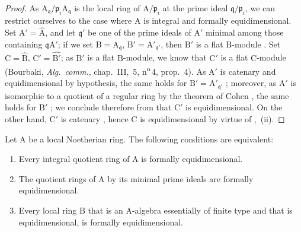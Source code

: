 \begin{proof}
As $\mathrm{A}_\mathfrak{q}/\mathfrak{p}_i\mathrm{A}_\mathfrak{q}$ is the local ring of $\mathrm{A}/\mathfrak{p}_i$ at the prime ideal $\mathfrak{q}/\mathfrak{p}_i$, we can restrict ourselves to the case where $\mathrm{A}$ is integral and formally equidimensional.
Set $\mathrm{A}'=\widehat{\mathrm{A}}$, and let $\mathfrak{q}'$ be one of the prime ideals of $\mathrm{A}'$ minimal among those containing $\mathfrak{q}\mathrm{A}'$; if we set $\mathrm{B}=\mathrm{A}_\mathfrak{q}$, $\mathrm{B}'=\mathrm{A}'_{\mathfrak{q}'}$, then $\mathrm{B}'$ is a flat $\mathrm{B}$-module .
Set $\mathrm{C}=\widehat{\mathrm{B}}$, $\mathrm{C}'=\widehat{\mathrm{B}'}$; as $\mathrm{B}'$ is a flat $\mathrm{B}$-module, we know that $\mathrm{C}'$ is a flat $\mathrm{C}$-module (Bourbaki, \emph{Alg.\ comm.}, chap.~III, \textsection\,5, n\textsuperscript{o}\,4, prop.~4).
As $\mathrm{A}'$ is catenary  and equidimensional by hypothesis, the same holds for $\mathrm{B}'=\mathrm{A}'_{\mathfrak{q}'}$ ; moreover, as $\mathrm{A}'$ is isomorphic to a quotient of a regular ring by the theorem of Cohen , the same holds for $\mathrm{B}'$ ; we conclude therefore from  that $\mathrm{C}'$ is equidimensional.
On the other hand, $\mathrm{C}'$ is catenary , hence $\mathrm{C}$ is equidimensional by virtue of ,~(ii).
\end{proof}

\begin{theorem}[7.1.8]
\label{IV.7.1.8}
Let $\mathrm{A}$ be a local Noetherian ring.
The following conditions are equivalent:
\begin{enumerate}[label=\emph{\alph*)}]
  \item Every integral quotient ring of $\mathrm{A}$ is formally equidimensional.
  \item The quotient rings of $\mathrm{A}$ by its minimal prime ideals are formally equidimensional.
  \item Every local ring $\mathrm{B}$ that is an A-algebra essentially of finite type  and that is equidimensional, is formally equidimensional.
\end{enumerate}
\end{theorem}

